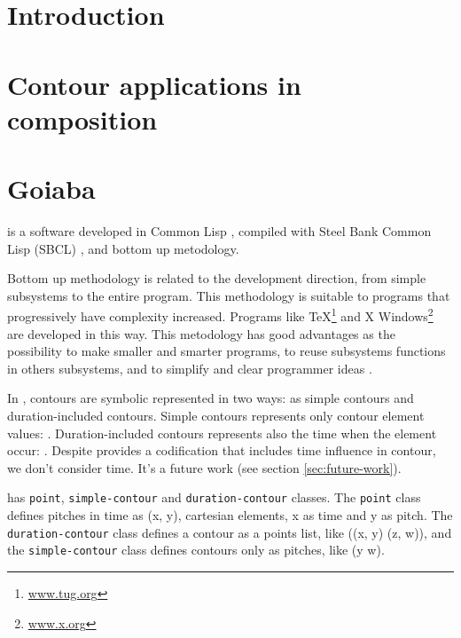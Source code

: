

\section{Introduction}
\label{sec:introduction}

\section{Contour applications in composition}
\label{sec:cont-appl-comp}

\section{Goiaba}
\label{sec:goiaba}

\goiaba{} is a software developed in Common Lisp \cite{graham94:lisp},
compiled with Steel Bank Common Lisp (SBCL) \cite{team07:sbcl}, and
bottom up metodology.

Bottom up methodology is related to the development direction, from
simple subsystems to the entire program. This methodology is suitable
to programs that progressively have complexity increased. Programs
like \TeX{}\footnote{\url{www.tug.org}} and X
Windows\footnote{\url{www.x.org}} are developed in this way. This
metodology has good advantages as the possibility to make smaller and
smarter programs, to reuse subsystems functions in others subsystems,
and to simplify and clear programmer ideas \cite{graham94:lisp}.

In \goiaba{}, contours are symbolic represented in two ways: as simple
contours and duration-included contours. Simple contours represents
only contour element values: . Duration-included
contours represents also the time when the element occur: . Despite \goiaba{} provides a codification that
includes time influence in contour, we don't consider time. It's a
future work (see section \ref{sec:future-work}).

\goiaba{} has \texttt{point}, \texttt{simple-contour} and
\texttt{duration-contour} classes. The \texttt{point} class defines
pitches in time as (x, y), cartesian elements, x as time and y as
pitch. The \texttt{duration-contour} class defines a contour as a
points list, like ((x, y) (z, w)), and the \texttt{simple-contour}
class defines contours only as pitches, like (y w).

